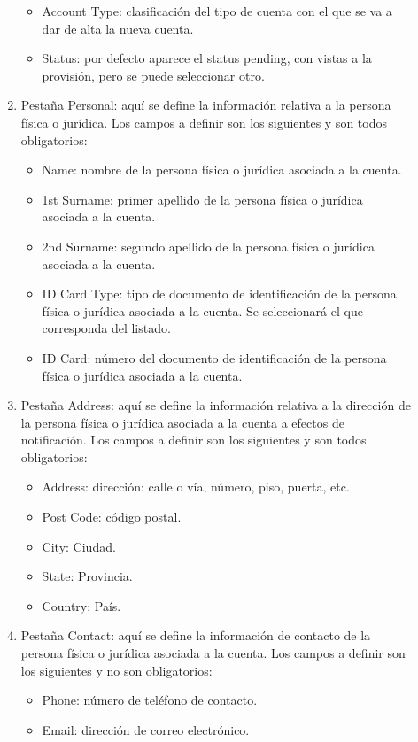 \begin{description}
\begin{enumerate}
\begin{itemize}
	\item Account Type: clasificación del tipo de cuenta con el que se va a dar de alta la nueva cuenta.
	\item Status: por defecto aparece el status pending, con vistas a la provisión, pero se puede seleccionar otro.
	\end{itemize}
\item Pestaña Personal: aquí se define la información relativa a la persona física o jurídica. Los campos a definir son los siguientes y son todos obligatorios:
	\begin{itemize}
	\item Name: nombre de la persona física o jurídica asociada a la cuenta.
	\item 1st Surname: primer apellido de la persona física o jurídica asociada a la cuenta.
	\item 2nd Surname: segundo apellido de la persona física o jurídica asociada a la cuenta.
	\item ID Card Type: tipo de documento de identificación de la persona física o jurídica asociada a la cuenta. Se seleccionará el que corresponda del listado.
	\item ID Card: número del documento de identificación de la persona física o jurídica asociada a la cuenta.
	\end{itemize}
\item Pestaña Address: aquí se define la información relativa a la dirección de la persona física o jurídica asociada a la cuenta a efectos de notificación. Los campos a definir son los siguientes y son todos obligatorios:
	\begin{itemize}
	\item Address: dirección: calle o vía, número, piso, puerta, etc.
	\item Post Code: código postal.
	\item City: Ciudad.
	\item State: Provincia.
	\item Country: País.
	\end{itemize}
\item Pestaña Contact: aquí se define la información de contacto de la persona física o jurídica asociada a la cuenta. Los campos a definir son los siguientes y no son obligatorios:
	\begin{itemize}
	\item Phone: número de teléfono de contacto.
	\item Email: dirección de correo electrónico.
	\end{itemize}

\end{enumerate}
\end{description}
